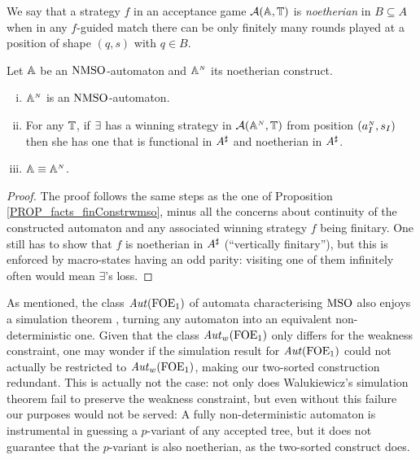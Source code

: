 \begin{definition}\label{def:noetherianstrategy}
We say that a strategy $f$ in an acceptance game $\mathcal{A}(\mathbb{A},\mathbb{T})$ is \emph{noetherian} in $B \subseteq A$ when in any $f$-guided match there can be only finitely many rounds played at a position of shape $(q,s)$ with $q \in B$.
\end{definition}


\begin{theorem}
\label{PROP_facts_noetConstr} 
Let $\mathbb{A}$ be an $\mathrm{NMSO}$-automaton and $\mathbb{A}^{{\scriptscriptstyle N}}$ its noetherian construct.
\begin{enumerate}[(i)]
   pt
  \item $\mathbb{A}^{{\scriptscriptstyle N}}$ is an $\mathrm{NMSO}$-automaton.\label{point:finConstrAut}
  \item For any $\mathbb{T}$, if $\exists$ has a winning strategy in $\mathcal{A}(\mathbb{A}^{{\scriptscriptstyle N}},\mathbb{T})$ from position $(a_I^{{\scriptscriptstyle N}},s_I)$ then she has one that is functional in $A^{\sharp}$ and noetherian in $A^{\sharp}$.%
  \label{point:finConstrStrategy}
  \item $\mathbb{A} \equiv \mathbb{A}^{{\scriptscriptstyle N}}$. \label{point:finConstrEquiv}
  \end{enumerate}
\end{theorem}
\begin{proof}
The proof follows the same steps as the one of Proposition \ref{PROP_facts_finConstrwmso}, minus all the concerns about continuity of the constructed automaton and any associated winning strategy $f$ being finitary. One still has to show that $f$ is noetherian in $A^{\sharp}$ (``vertically finitary''), but this is enforced by macro-states having an odd parity: visiting one of them infinitely often would mean $\exists$'s loss.
\end{proof}

\begin{remark}
As mentioned, the class $\mathit{Aut}(\mathrm{FOE}_1)$ of automata characterising $\mathrm{MSO}$ 
\cite{Jan96} also enjoys a simulation theorem \cite{Walukiewicz96}, turning any 
automaton into an equivalent non-deterministic one. 
Given that the class $\mathit{Aut}_{w}(\mathrm{FOE}_1)$ only differs for the weakness constraint, 
one may wonder if the simulation result for $\mathit{Aut}(\mathrm{FOE}_1)$ could not actually be
restricted to $\mathit{Aut}_{w}(\mathrm{FOE}_1)$, making our two-sorted construction redundant. 
This is actually not the case: not only does Walukiewicz's simulation theorem
\cite{Walukiewicz96} fail to preserve the weakness constraint, but even without
this failure our purposes would not be served: 
A fully non-deterministic automaton is instrumental in guessing a $p$-variant 
of any accepted tree, but it does not guarantee that the $p$-variant is also 
noetherian, as the two-sorted construct does.
\end{remark}

